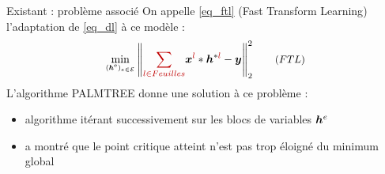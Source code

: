 \begin{frame}{Existant : problème associé}
On appelle \eqref{eq_ftl} (\alert{Fast Transform Learning}) l'adaptation de \eqref{eq_dl} à ce modèle :
\begin{equation*} {\small
\underset{\substack{(\h^\text{e})_{e \in \E}}}\min
	\norm{\Req{\sum_{l \in Feuilles}} \x^{\Req{l}} * \h^{*\Req{l}} -\y}{2}^2 \tag{${FTL}$} \label{eq_ftl}
    }
\end{equation*}
L'algorithme \alert{PALMTREE} donne une solution à ce problème :
\begin{itemize}
	\item algorithme itérant successivement sur les blocs de variables $\bm{h}^e$
	\item \cite{chabiron_optimization_2016} a montré que le point  critique atteint n'est pas trop éloigné du minimum global
\end{itemize}
\end{frame}


